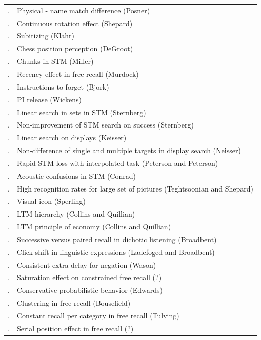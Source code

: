 \documentclass{paper}
\newcounter{magicrownumbers}[figure]
\newcommand\rownumber{\stepcounter{magicrownumbers}\arabic{magicrownumbers}.}
\begin{document}
\begin{table}
\begin{center}
\footnotesize
\begin{tabular}{l l}
\rownumber & Physical - name match difference (Posner)\\
\rownumber & Continuous rotation effect (Shepard) \\
\rownumber & Subitizing (Klahr) \\
\rownumber & Chess position perception (DeGroot) \\
\rownumber & Chunks in STM (Miller) \\
\rownumber & Recency effect in free recall (Murdock) \\
\rownumber & Instructions to forget (Bjork) \\
\rownumber & PI release (Wickens) \\
\rownumber & Linear search in sets in STM (Sternberg) \\
\rownumber & Non-improvement of STM search on success (Sternberg) \\
\rownumber & Linear search on displays (Keisser) \\
\rownumber & Non-difference of single and multiple targets in display search (Neisser) \\
\rownumber & Rapid STM loss with interpolated task (Peterson and Peterson) \\
\rownumber & Acoustic confusions in STM (Conrad) \\
\rownumber & High recognition rates for large set of pictures (Teghtsoonian and Shepard) \\
\rownumber & Visual icon (Sperling) \\ 
\rownumber & LTM hierarchy (Collins and Quillian) \\
\rownumber & LTM principle of economy (Collins and Quillian) \\
\rownumber & Successive versus paired recall in dichotic listening (Broadbent) \\
\rownumber & Click shift in linguistic expressions (Ladefoged and Broadbent) \\
\rownumber & Consistent extra delay for negation (Wason) \\
\rownumber & Saturation effect on constrained free recall (?) \\
\rownumber & Conservative probabilistic behavior (Edwards) \\
\rownumber & Clustering in free recall (Bousefield) \\
\rownumber & Constant recall per category in free recall (Tulving) \\
\rownumber & Serial position effect in free recall (?) \\

\end{tabular}
\end{center}
\end{table}
\end{document}
